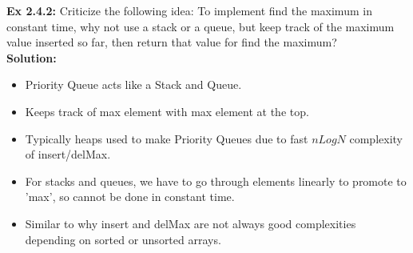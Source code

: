 \documentclass[11pt,fleqn]{article}
\begin{document}
\textbf{Ex 2.4.2:} Criticize the following idea: To implement find the maximum in constant time,
why not use a stack or a queue, but keep track of the maximum value inserted so far,
then return that value for find the maximum?\\

\textbf{Solution:}\\

\begin{itemize}
	\item Priority Queue acts like a Stack and Queue.
	\item Keeps track of max element with max element at the top.
	\item Typically heaps used to make Priority Queues due to fast $nLogN$ complexity of insert/delMax.
	\item For stacks and queues, we have to go through elements linearly to promote to 'max', so cannot be done in constant time.
	\item Similar to why insert and delMax are not always good complexities depending on sorted or unsorted arrays.
	
\end{itemize}
\end{document}
